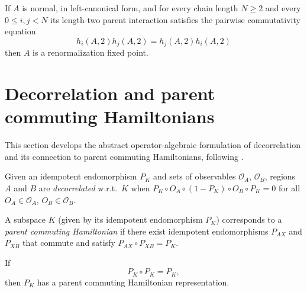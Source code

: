 \begin{theorem}\label{thm:nncph_implies_rfp}
    \leanok
    If $A$ is normal, in left-canonical form, and for every chain length
    $N \ge 2$ and every $0\le i,j<N$ its length-two parent interaction
    satisfies the pairwise commutativity equation
    \[
        h_i(A,2)h_j(A,2)=h_j(A,2)h_i(A,2)
    \]
    then $A$ is a renormalization fixed point.
\end{theorem}

\section{Decorrelation and parent commuting Hamiltonians}%
\label{sec:decorrelation}

This section develops the abstract operator-algebraic formulation of
decorrelation and its connection to parent commuting Hamiltonians, following
\cite[Appendix~D, Section~D.2]{Cirac2016MPDO_arXiv}.

\begin{definition}[Decorrelation]\label{def:is_decorrelated}
    \leanok
    Given an idempotent endomorphism $P_K$ and sets of observables
    $\mathcal{O}_A$, $\mathcal{O}_B$, regions $A$ and $B$ are
    \emph{decorrelated} w.r.t.\ $K$ when
    $P_K \circ O_A \circ (1 - P_K) \circ O_B \circ P_K = 0$
    for all $O_A \in \mathcal{O}_A$, $O_B \in \mathcal{O}_B$.
\end{definition}

\begin{definition}\label{def:has_commuting_parent_ham}
    \leanok
    A subspace $K$ (given by its idempotent endomorphism $P_K$) corresponds to
    a \emph{parent commuting Hamiltonian} if there exist idempotent endomorphisms
    $P_{AX}$ and $P_{XB}$ that commute and satisfy
    $P_{AX} \circ P_{XB} = P_K$.
\end{definition}

\begin{theorem}%
    \label{thm:has_commuting_parent_ham_of_idem}
    \leanok
    If
    \[
        P_K \circ P_K = P_K,
    \]
    then $P_K$ has a parent commuting Hamiltonian representation.
\end{theorem}

